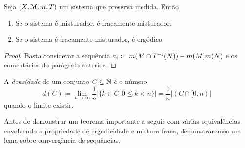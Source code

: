 \begin{proposition}
	Seja $(X,\mathcal{M},m,T)$ um sistema que preserva medida. Então
	\begin{enumerate}
	\item Se o sistema é misturador, é fracamente misturador.
	\item Se o sistema é fracamente misturador, é ergódico.
	\end{enumerate}
\end{proposition}
\begin{proof}
	Basta considerar a sequência $a_i\coloneqq m(M \cap T^{-i}(N)) - m(M)m(N)$ e os comentários do parágrafo anterior.
\end{proof}

\begin{definition}
	A \emph{densidade} de um conjunto $C \subseteq \mathbb{N}$ é o número
	\begin{equation*}
	d(C) \coloneqq \lim_{n \to \infty} \frac{1}{n} \left|\{k \in C: 0 \leq k < n\}\right| = \frac{1}{n} \left|(C \cap [0,n)\right|
	\end{equation*}
quando o limite existir.
\end{definition}

	Antes de demonstrar um teorema importante a seguir com várias equivalências envolvendo a propriedade de ergodicidade e mistura fraca, demonstraremos um lema sobre convergência de sequências.

